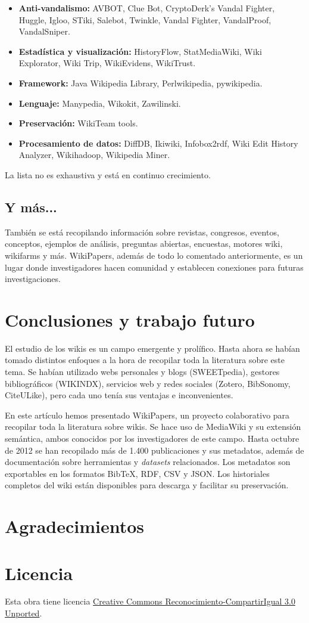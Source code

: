 \documentclass[11pt,twocolumn]{article}
\begin{document}
\begin{itemize}
\item \textbf{Anti-vandalismo:} AVBOT, Clue Bot, CryptoDerk's Vandal Fighter, Huggle, Igloo, STiki, Salebot, Twinkle, Vandal Fighter, VandalProof, VandalSniper.
\item \textbf{Estadística y visualización:} HistoryFlow, StatMediaWiki, Wiki Explorator, Wiki Trip, WikiEvidens, WikiTrust.
\item \textbf{Framework:} Java Wikipedia Library, Perlwikipedia, pywikipedia.
\item \textbf{Lenguaje:} Manypedia, Wikokit, Zawilinski.
\item \textbf{Preservación:} WikiTeam tools.
\item \textbf{Procesamiento de datos:} DiffDB, Ikiwiki, Infobox2rdf, Wiki Edit History Analyzer, Wikihadoop, Wikipedia Miner.
\end{itemize}

La lista no es exhaustiva y está en continuo crecimiento.

\subsection{Y más...}
También se está recopilando información sobre revistas, congresos, eventos, conceptos, ejemplos de análisis, preguntas abiertas, encuestas, motores wiki, wikifarms y más. WikiPapers, además de todo lo comentado anteriormente, es un lugar donde investigadores hacen comunidad y establecen conexiones para futuras investigaciones.

\section{Conclusiones y trabajo futuro}
El estudio de los wikis es un campo emergente y prolífico. Hasta ahora se habían tomado distintos enfoques a la hora de recopilar toda la literatura sobre este tema. Se habían utilizado webs personales y blogs (SWEETpedia), gestores bibliográficos (WIKINDX), servicios web y redes sociales (Zotero, BibSonomy, CiteULike), pero cada uno tenía sus ventajas e inconvenientes.

En este artículo hemos presentado WikiPapers, un proyecto colaborativo para recopilar toda la literatura sobre wikis. Se hace uso de MediaWiki y su extensión semántica, ambos conocidos por los investigadores de este campo. Hasta octubre de 2012 se han recopilado más de 1.400 publicaciones y sus metadatos, además de documentación sobre herramientas y \emph{datasets} relacionados. Los metadatos son exportables en los formatos BibTeX, RDF, CSV y JSON. Los historiales completos del wiki están disponibles para descarga y facilitar su preservación.




\section*{Agradecimientos}


\section*{Licencia}
Esta obra tiene licencia \href{http://creativecommons.org/licenses/by-sa/3.0/}{Creative Commons Reconocimiento-CompartirIgual 3.0 Unported}.
\end{document}
